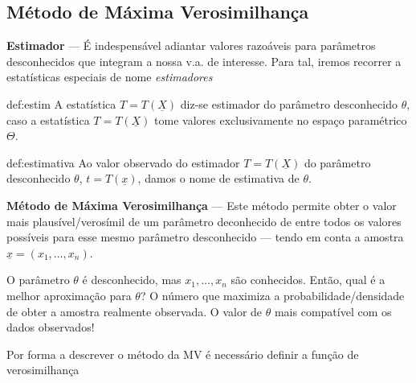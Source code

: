 \subsection[4.2 Método de Máxima Verosimilhança]{\hspace*{0.075 em}\raisebox{0.2 em}{$\pmb{\drsh}$}Método de Máxima Verosimilhança}

\noindent\textbf{Estimador} --- É indespensável adiantar valores razoáveis para parâmetros desconhecidos que integram a nossa v.a. de interesse. Para tal, iremos recorrer a estatísticas especiais de nome \textit{estimadores}

\begin{theo}{def:estim}\label{def:estim}
    \noindent A estatística $T = T(\underline{X})$ diz-se estimador do parâmetro desconhecido $\theta$, caso a estatística $T = T(\underline{X})$ tome valores exclusivamente no espaço paramétrico $\Theta$.
\end{theo}

\vspace{-1.2em}
\begin{theo}{def:estimativa}\label{def:estimativa}
    \noindent Ao valor observado do estimador $T = T(\underline{X})$ do parâmetro desconhecido $\theta$, $t = T(\underline{x})$, damos o nome de estimativa de $\theta$.
\end{theo}

\noindent \textbf{Método de Máxima Verosimilhança} --- Este método permite obter o valor mais plausível/verosímil de um parâmetro deconhecido de entre todos os valores possíveis para esse mesmo parâmetro desconhecido --- tendo em conta a amostra $\underline{x} = (x_1, \dots, x_n)$.

{

\begin{mdframed}
    O parâmetro $\theta$ é desconhecido, mas $x_1,\dots, x_n$ são conhecidos. Então, qual é a melhor aproximação para $\theta$? O número que maximiza a probabilidade/densidade de obter a amostra realmente observada. O valor de $\theta$ mais compatível com os dados observados!
\end{mdframed}
}
\newpage
\noindent Por forma a descrever o método da MV é necessário definir a função de verosimilhança

